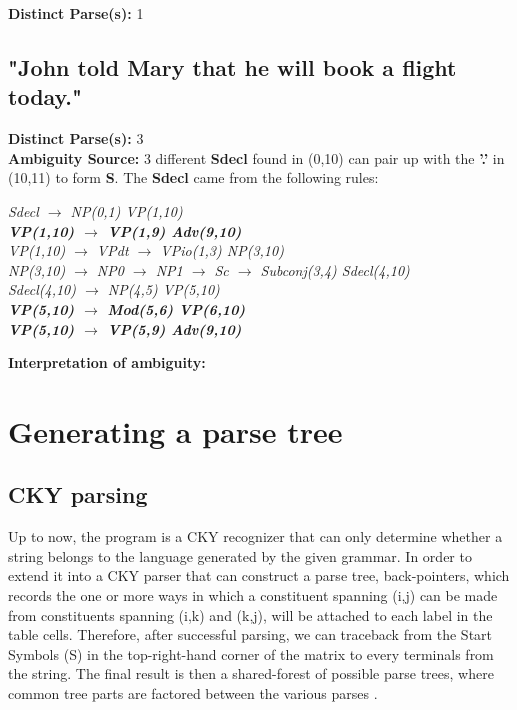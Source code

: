 \documentclass{article}
\begin{document}
\textbf{Distinct Parse(s):} 1

\subsection{"John told Mary that he will book a flight today."}

\textbf{Distinct Parse(s):} 3\\

\textbf{Ambiguity Source:} 3 different \textbf{Sdecl} found in (0,10) can pair up with the \textbf{'.'} in (10,11) to form \textbf{S}. The \textbf{Sdecl} came from the following rules:

\begin{center}
	\emph{Sdecl $\rightarrow$ NP(0,1) VP(1,10)}\\
	\textbf{\emph{VP(1,10) $\rightarrow$ VP(1,9) Adv(9,10)}}\\
	\emph{VP(1,10) $\rightarrow$ VPdt $\rightarrow$ VPio(1,3) NP(3,10)}\\
	
	\emph{NP(3,10) $\rightarrow$ NP0 $\rightarrow$ NP1 $\rightarrow$ Sc $\rightarrow$ Subconj(3,4) Sdecl(4,10)}\\
	\emph{Sdecl(4,10) $\rightarrow$ NP(4,5) VP(5,10)}\\
	\textbf{\emph{VP(5,10) $\rightarrow$ Mod(5,6) VP(6,10)}\\
	\emph{VP(5,10) $\rightarrow$ VP(5,9) Adv(9,10)}}
\end{center}

\textbf{Interpretation of ambiguity:}\\



\section{Generating a parse tree}

\subsection{CKY parsing}

Up to now, the program is a CKY recognizer that can only determine whether a string belongs to the language generated by the given grammar. In order to extend it into a CKY parser that can construct a parse tree, back-pointers, which records the one or more ways in which a constituent spanning (i,j) can be made from constituents spanning (i,k) and (k,j), will be attached to each label in the table cells. Therefore, after successful parsing, we can traceback from the Start Symbols (S) in the top-right-hand corner of the matrix to every terminals from the string. The final result is then a shared-forest of possible parse trees, where common tree parts are factored between the various parses \cite{lang1994recognition}.
\end{document}
